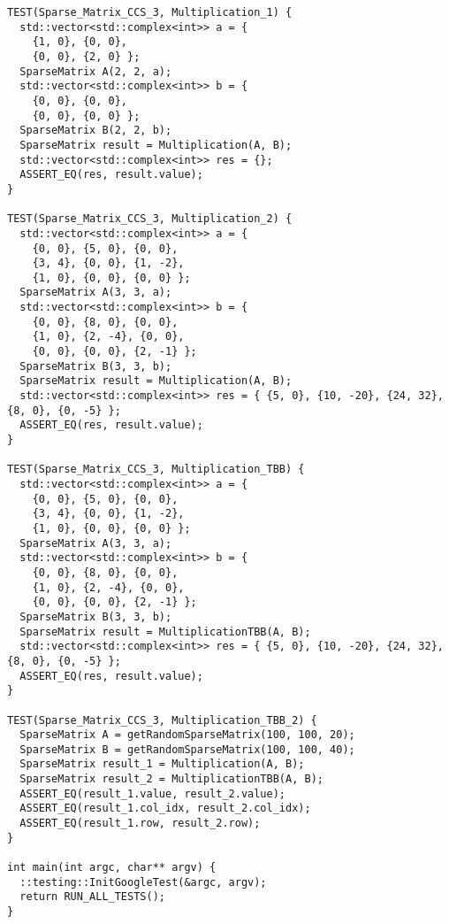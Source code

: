\documentclass{report}
\begin{document}
\begin{lstlisting}
TEST(Sparse_Matrix_CCS_3, Multiplication_1) {
  std::vector<std::complex<int>> a = {
    {1, 0}, {0, 0},
    {0, 0}, {2, 0} };
  SparseMatrix A(2, 2, a);
  std::vector<std::complex<int>> b = {
    {0, 0}, {0, 0},
    {0, 0}, {0, 0} };
  SparseMatrix B(2, 2, b);
  SparseMatrix result = Multiplication(A, B);
  std::vector<std::complex<int>> res = {};
  ASSERT_EQ(res, result.value);
}

TEST(Sparse_Matrix_CCS_3, Multiplication_2) {
  std::vector<std::complex<int>> a = {
    {0, 0}, {5, 0}, {0, 0},
    {3, 4}, {0, 0}, {1, -2},
    {1, 0}, {0, 0}, {0, 0} };
  SparseMatrix A(3, 3, a);
  std::vector<std::complex<int>> b = {
    {0, 0}, {8, 0}, {0, 0},
    {1, 0}, {2, -4}, {0, 0},
    {0, 0}, {0, 0}, {2, -1} };
  SparseMatrix B(3, 3, b);
  SparseMatrix result = Multiplication(A, B);
  std::vector<std::complex<int>> res = { {5, 0}, {10, -20}, {24, 32}, {8, 0}, {0, -5} };
  ASSERT_EQ(res, result.value);
}

TEST(Sparse_Matrix_CCS_3, Multiplication_TBB) {
  std::vector<std::complex<int>> a = {
    {0, 0}, {5, 0}, {0, 0},
    {3, 4}, {0, 0}, {1, -2},
    {1, 0}, {0, 0}, {0, 0} };
  SparseMatrix A(3, 3, a);
  std::vector<std::complex<int>> b = {
    {0, 0}, {8, 0}, {0, 0},
    {1, 0}, {2, -4}, {0, 0},
    {0, 0}, {0, 0}, {2, -1} };
  SparseMatrix B(3, 3, b);
  SparseMatrix result = MultiplicationTBB(A, B);
  std::vector<std::complex<int>> res = { {5, 0}, {10, -20}, {24, 32}, {8, 0}, {0, -5} };
  ASSERT_EQ(res, result.value);
}

TEST(Sparse_Matrix_CCS_3, Multiplication_TBB_2) {
  SparseMatrix A = getRandomSparseMatrix(100, 100, 20);
  SparseMatrix B = getRandomSparseMatrix(100, 100, 40);
  SparseMatrix result_1 = Multiplication(A, B);
  SparseMatrix result_2 = MultiplicationTBB(A, B);
  ASSERT_EQ(result_1.value, result_2.value);
  ASSERT_EQ(result_1.col_idx, result_2.col_idx);
  ASSERT_EQ(result_1.row, result_2.row);
}

int main(int argc, char** argv) {
  ::testing::InitGoogleTest(&argc, argv);
  return RUN_ALL_TESTS();
}
\end{lstlisting}
\end{document}
